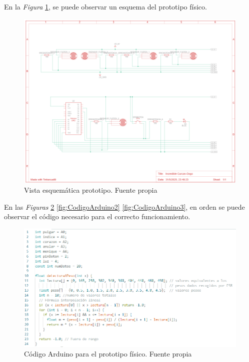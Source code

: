 En la \textit{Figura} \ref{fig:Vista esquemática prototipo}, se puede observar un esquema del prototipo físico.
\begin{figure}
    \centering
    \includegraphics[width=1\linewidth]{img/Vista esquematica prototipo.png}
    \caption{Vista esquemática prototipo. Fuente propia}
    \label{fig:Vista esquemática prototipo}
\end{figure}
En las \textit{Figuras} \ref{fig:CodigoArduino1} \ref{fig:CodigoArduino2} \ref{fig:CodigoArduino3}, en orden se puede observar el código necesario para el correcto funcionamiento.
\begin{figure}
    \centering
    \includegraphics[width=1.25\linewidth]{img/CodigoArduino1.png}
    \caption{Código Arduino para el prototipo físico. Fuente propia}
    \label{fig:CodigoArduino1}
\end{figure}
